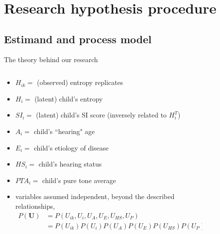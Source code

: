 \section{Research hypothesis procedure}
%
%
\subsection{Estimand and process model}
%
%
\begin{frame}[t, negative]
	\subsectionpage
\end{frame}
%
%
\begin{frame}
	{The theory behind our research}
	\begin{columns}
		\begin{column}{0.5\textwidth}
			\begin{itemize}
				\item $H_{ik}=$ (observed) entropy replicates
				\item $H_{i}=$ (latent) child's entropy
				\item $SI_{i}=$ (latent) child's SI score \alert{(inversely related to $H^{T}_{i}$)}
				\item $A_{i}=$ child's ``hearing" age
				\item $E_{i}=$ child's etiology of disease
				\item $HS_{i}=$ child's hearing status
				\item $PTA_{i}=$ child's pure tone average
				\item variables \alert{assumed independent}, beyond the described relationships,
				\begin{equation*}
					\begin{aligned} 
						P(\pmb{U}) & = P(U_{ik}, U_{i}, U_{A}, U_{E}, U_{HS}, U_{P}) \\ 
						& = P(U_{ik}) P(U_{i}) P(U_{A}) P(U_{E}) P(U_{HS}) P(U_{P})
					\end{aligned}
				\end{equation*}
			\end{itemize}
		\end{column}
		\begin{column}{0.5\textwidth}  
			\begin{figure}
\end{figure}
\end{column}
\end{columns}
\end{frame}
